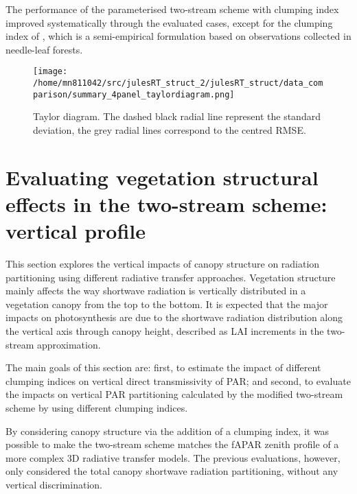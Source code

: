 The performance of the parameterised two-stream scheme with clumping index improved systematically through the evaluated cases, except for the clumping index of \citet{Kucharik1999}, which is a semi-empirical formulation based on observations collected in needle-leaf forests. 

\begin{figure}[ht!]
\centering
\texttt{[image: /home/mn811042/src/julesRT\_struct\_2/julesRT\_struct/data\_comparison/summary\_4panel\_taylordiagram.png]}
\caption{Taylor diagram. The dashed black radial line represent the standard deviation, the grey radial lines correspond to the centred RMSE.} 
\label{fig:taylor_chapter4}
\end{figure}

\section{Evaluating vegetation structural effects in the two-stream scheme: vertical profile}\label{section:vertical_profile}

This section explores the vertical impacts of canopy structure on radiation partitioning using different radiative transfer approaches. Vegetation structure mainly affects the way shortwave radiation is vertically distributed in a vegetation canopy from the top to the bottom. It is expected that the major impacts on photosynthesis are due to the shortwave radiation distribution along the vertical axis through canopy height, described as LAI increments in the two-stream approximation. 


The main goals of this section are: first, to estimate the impact of different clumping indices on vertical direct transmissivity of PAR; and second, to evaluate the impacts on vertical PAR partitioning calculated by the modified two-stream scheme by using different clumping indices.

By considering canopy structure via the addition of a clumping index, it was possible to make the two-stream scheme matches the fAPAR zenith profile of a more complex 3D radiative transfer models. The previous evaluations, however, only considered the total canopy shortwave radiation partitioning, without any vertical discrimination.

